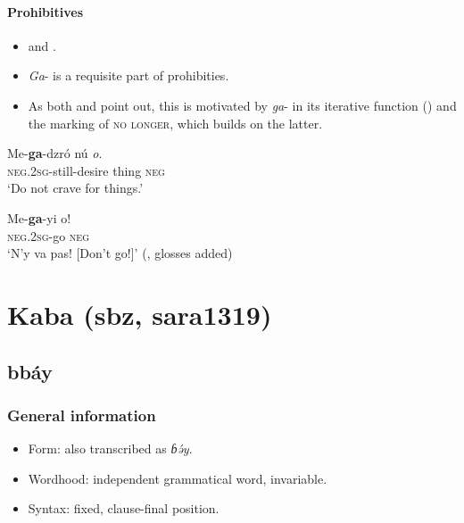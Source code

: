 \paragraph{Prohibitives}\label{appendixEweProhibitives}
\begin{itemize}
	\item \textcite[53]{Ameka1991} and \textcite[67]{Westermann1907}.
	\item \textit{Ga}- is a requisite part of prohibities.
	\item As both \citeauthor{Ameka1991} and \cite{Westermann1907} point out, this is motivated by \mbox{\textit{ga}-} in its iterative function () and the marking of \textsc{no longer}, which builds on the latter.
\end{itemize}
\begin{exe}
	\ex 
	\gll Me-\textbf{ga}-dzró nú \textit{o}.\\
	\textsc{neg}.2\textsc{sg}-still-desire thing \textsc{neg}\\
	\glt \lq Do not crave for things.\rq{ }\parencite[358]{Ameka1991}
	
	\ex 
	\gll Me-\textbf{ga}-yi o!\\
	\textsc{neg}.2\textsc{sg}-go \textsc{neg}\\
	\glt \lq{}N'y va pas! [Don't go!]\rq{ }(\cite[468]{Rongier2015}, glosses added)
\end{exe}

\section{Kaba (sbz, sara1319)}\label{appendixKaba}
\subsection{bbáy}
\subsubsection{General information}
\begin{itemize}
	\item Form: also transcribed as \textit{ɓə́y}.
	\item Wordhood: independent grammatical word, invariable.
	\item Syntax: fixed, clause-final position.
\end{itemize}


